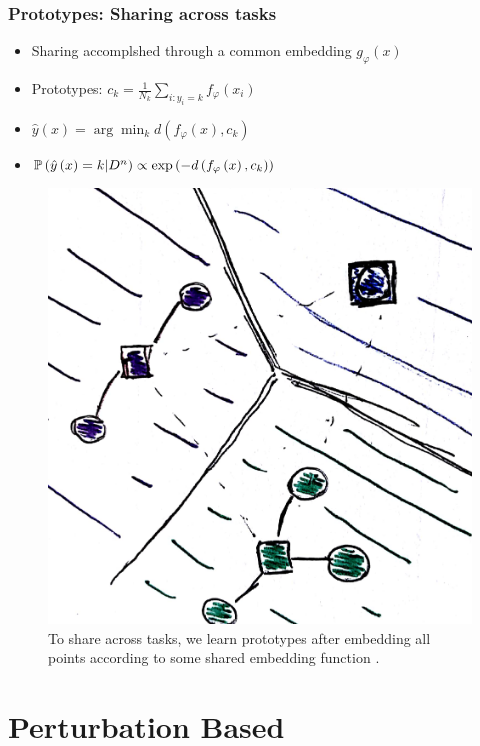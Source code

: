 \documentclass[10pt,mathserif]{beamer}
\begin{document}
\begin{frame}
  \frametitle{Prototypes: Sharing across tasks}
 \begin{itemize}
 \item Sharing accomplshed through a common embedding $g_{\varphi}\left(x\right)$
 \item Prototypes: $c_k = \frac{1}{N_k} \sum_{i : y_i = k} f_{\varphi}\left(x_i\right)$
 \item $\hat{y}\left(x\right) = \arg \min_{k} d\left(f_\varphi\left(x\right), c_k\right)$
 \item $\mathbb{P}\left({\hat{y}\left(x\right) = k \vert D^{n}}\right) \propto \operatorname{exp}\left(-d\left(f_\varphi\left(x\right), c_k\right)\right)$
 \end{itemize} 
\begin{figure}[ht]
  \centering
  \includegraphics[width=0.35\paperwidth]{figure/prototypes_5}
  \caption{To share across tasks, we learn prototypes after embedding all points
    according to some shared embedding function \label{fig:prototypes_5}.}
\end{figure}
\end{frame}

\section{Perturbation Based}
\end{document}
